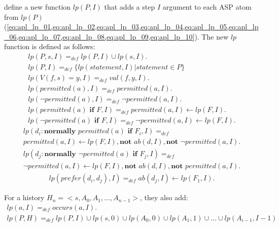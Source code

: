 \citet{gelfond_authorization_2008} define a new function $lp(P, I)$ that adds a step $I$ argument to each ASP atom from $lp(P)$ (\cref{eq:apl_lp_01,eq:apl_lp_02,eq:apl_lp_03,eq:apl_lp_04,eq:apl_lp_05,eq:apl_lp_06,eq:apl_lp_07,eq:apl_lp_08,eq:apl_lp_09,eq:apl_lp_10}).
The new $lp$ function is defined as follows:
\begin{gather}
    lp(P,s,I) =_{def} lp(P,I)\cup lp(s,I). \label{eq:apl_lp_inc_01} \\
    lp(P,I)=_{def}\{lp(statement,I) | statement \in P\} \label{eq:apl_lp_inc_02} \\
    lp\left(V(f,s)=y,I\right) =_{def}
        val\left(f,y,I\right). \label{eq:apl_lp_inc_03} \\
    lp(permitted(a),I) =_{def}
        permitted(a, I). \label{eq:apl_lp_inc_04} \\
    lp(\neg permitted(a),I) =_{def}
        \neg permitted(a, I). \label{eq:apl_lp_inc_05} \\
    lp(permitted(a) \textbf{ if } F, I) =_{def}
        permitted(a, I) \leftarrow
            lp(F, I). \label{eq:apl_lp_inc_06} \\
    lp(\neg permitted(a) \textbf{ if } F, I) =_{def}
        \neg permitted(a, I) \leftarrow
            lp(F, I). \label{eq:apl_lp_inc_07}
\end{gather}
\begin{multline}
    \label{eq:apl_lp_inc_08}
    lp(d_i: \textbf{normally } permitted(a) \textbf{ if } F_i, I) =_{def} \\
        permitted(a, I) \leftarrow
            lp(F, I),
            \textbf{not } ab(d, I),
            \textbf{not } \neg permitted(a, I).
\end{multline}
\begin{multline}
    \label{eq:apl_lp_inc_09}
    lp(d_j: \textbf{normally } \neg permitted(a) \textbf{ if } F_j, I) =_{def} \\
        \neg permitted(a, I) \leftarrow
            lp(F, I),
            \textbf{not } ab(d, I),
            \textbf{not } permitted(a, I).
\end{multline}
\begin{gather}
    lp(prefer(d_i, d_j), I) =_{def}
        ab(d_j, I) \leftarrow lp(F_1, I). \label{eq:apl_lp_inc_10}
\end{gather}

For a history $H_n=<s, A_0, A_1, \dots, A_{n-1}>$, they also add:
\begin{gather}
    lp(a, I)=_{def}occurs(a, I). \\
    lp(P, H) =_{def} lp(P, I) \cup lp(s, 0) \cup lp(A_0, 0) \cup lp(A_1, 1) \cup \dots \cup lp(A_{i-1}, I-1)
\end{gather}

